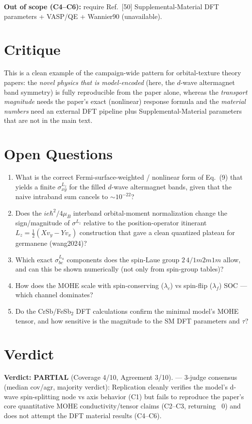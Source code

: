 \documentclass[11pt]{article}
\begin{document}
\textbf{Out of scope (C4--C6):} require Ref.~[50] Supplemental-Material DFT parameters + VASP/QE + Wannier90 (unavailable).

\section{Critique}
This is a clean example of the campaign-wide pattern for orbital-texture theory papers: the \emph{novel physics that is model-encoded} (here, the $d$-wave altermagnet band symmetry) is fully reproducible from the paper alone, whereas the \emph{transport magnitude} needs the paper's exact (nonlinear) response formula and the \emph{material numbers} need an external DFT pipeline plus Supplemental-Material parameters that are not in the main text.

\section*{Open Questions}
\begin{enumerate}
\item What is the correct Fermi-surface-weighted / nonlinear form of Eq.~(9) that yields a finite $\sigma^{L_z}_{xy}$ for the filled $d$-wave altermagnet bands, given that the naive intraband sum cancels to $\sim10^{-22}$?
\item Does the $ie\hbar^2/4\mu_B$ interband orbital-moment normalization change the sign/magnitude of $\sigma^{L_z}$ relative to the position-operator itinerant $L_z=\tfrac12(Xv_y-Yv_x)$ construction that gave a clean quantized plateau for germanene (wang2024)?
\item Which exact $\sigma^{L_a}_{bc}$ components does the spin-Laue group $2\,4/1m2m1m$ allow, and can this be shown numerically (not only from spin-group tables)?
\item How does the MOHE scale with spin-conserving ($\lambda_c$) vs spin-flip ($\lambda_f$) SOC --- which channel dominates?
\item Do the CrSb/FeSb$_2$ DFT calculations confirm the minimal model's MOHE tensor, and how sensitive is the magnitude to the SM DFT parameters and $\tau$?
\end{enumerate}


\section{Verdict}
\textbf{Verdict: PARTIAL} (Coverage 4/10, Agreement 3/10). — 3-judge consensus (median cov/agr, majority verdict): Replication cleanly verifies the model’s d-wave spin-splitting node vs axis behavior (C1) but fails to reproduce the paper’s core quantitative MOHE conductivity/tensor claims (C2–C3, returning ~0) and does not attempt the DFT material results (C4–C6).
\end{document}
